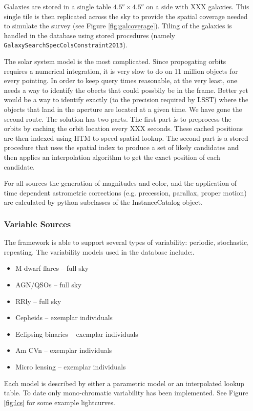 \documentclass[]{article}
\begin{document}
{Galaxies are stored in a single table $4.5^o \times 4.5^o$ on a side with XXX galaxies. This single tile is then replicated across the sky to 
provide the spatial coverage needed to simulate the survey (see Figure \ref{fig:galcoverage}).  
Tiling of the galaxies is handled in the database using stored procedures (namely {\tt GalaxySearchSpecColsConstraint2013}).

The solar system model is the most complicated.  Since propogating orbits requires a numerical integration, it is very slow to do on 
11 million objects for every pointing.  In order to keep query times reasonable, at the very least, one needs a way to 
identify the obects that could possbily be in the frame.  Better yet would be a way to identify exactly (to the precision
required by LSST) where the objects that land in the aperture are located at a given time.  We have gone the second route.
The solution has two parts.  The first part is to preprocess the orbits by caching the orbit location every XXX seconds. 
These cached positions are then indexed using HTM to speed spatial lookup.
The second part is a stored procedure that uses the spatial index to produce a set of likely candidates and then applies
an interpolation algorithm to get the exact position of each candidate.

For all sources the generation of magnitudes and color, and the application of time dependent astrometric corrections (e.g. 
precession, parallax, proper motion) are calculated by python subclasses of the InstanceCatalog object.

\subsubsection{Variable Sources}
The framework is able to support several types of variability: periodic, stochastic, repeating.
The variability models used in the database include:.  
\begin{itemize}
\item M-dwarf flares -- full sky
\item AGN/QSOs -- full sky
\item RRly -- full sky
\item Cepheids -- exemplar individuals
\item Eclipsing binaries -- exemplar individuals
\item Am CVn -- exemplar individuals
\item Micro lensing -- exemplar individuals
\end{itemize}
Each model is described by either a parametric model or an interpolated lookup table.  To date only mono-chromatic variability has been implemented.
See Figure \ref{fig:lcs} for some example lightcurves.

}
\end{document}
